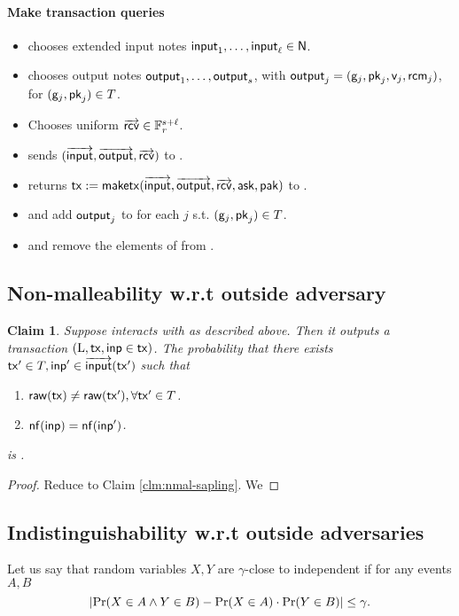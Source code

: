 \documentclass[11pt]{article}
\numberwithin{equation}{section} %
\numberwithin{figure}{section} %
\newtheorem{claim}[thm]{Claim}
\newcommand{\inp}{\ensuremath{\mathsf{inp}}\xspace}
\newcommand{\out}{\ensuremath{\mathsf{out}}\xspace}
\begin{document}
\paragraph{Make transaction queries}
\begin{itemize}
\item \adv chooses extended input notes $\mathsf{input}_1,\ldots,\mathsf{input}_\ell\in\mathsf{N}$.
\item \adv chooses output notes $\mathsf{output}_1,\ldots,\mathsf{output}_s$, with $\mathsf{output}_j = (\mathsf{g}_j,\mathsf{pk}_j,\mathsf{v}_j,\mathsf{rcm}_j)$, for $(\mathsf{g}_j,\mathsf{pk}_j)\in T$.
\item \adv Chooses uniform $\overrightarrow{\mathsf{rcv}}\in {\mathbb F}_r^{s+\ell}$.
\item \adv sends $(\overrightarrow{\mathsf{input}},\overrightarrow{\mathsf{output}},\overrightarrow{\mathsf{rcv}})$ to \oracle.
\item \oracle returns $\mathsf{tx}:= \mathsf{maketx}(\overrightarrow{\mathsf{input}},\overrightarrow{\mathsf{output}},\overrightarrow{\mathsf{rcv}},\mathsf{ask},\mathsf{pak})$ to \adv.
\item \adv and \oracle add $\mathsf{output}_j$ to \curnotes for each $j$ s.t. $(\mathsf{g}_j,\mathsf{pk}_j)\in T$.
\item \adv and \oracle remove the elements of  from \curnotes.
\end{itemize}


 
\subsection{Non-malleability w.r.t outside adversary}
\begin{claim}\label{clm:nmal-sapling-outside}
 Suppose \adv interacts with \oracle as described above.
 Then it outputs a transaction $(\ledger,\tx,\inp\in\tx)$.
 The probability that there exists $\tx'\in T,\inp'\in \inputs(\tx')$ such that 
 \begin{enumerate}
  \item $\mathsf{raw(\mathsf{tx})}\neq \mathsf{raw(\mathsf{tx}')},\forall \mathsf{tx}'\in T$.
  \item $\nf(\inp)=\nf(\inp')$.
 \end{enumerate}
is \negl.
\end{claim}
\begin{proof}
Reduce to Claim \ref{clm:nmal-sapling}.
We
\end{proof}
\subsection{Indistinguishability w.r.t outside adversaries}
Let us say that random variables $X,Y$ are $\gamma$-close to independent if for
any events $A,B$
\[|\mathrm{Pr}(X\in A \wedge Y\in B)-\mathrm{Pr}(X\in A)\cdot \mathrm{Pr}(Y\in B)|\leq \gamma.\]
\end{document}
